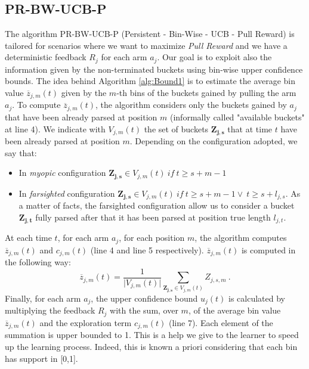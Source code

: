 \subsection{PR-BW-UCB-P}
The algorithm PR-BW-UCB-P (Persistent - Bin-Wise - UCB - Pull Reward)  is tailored for scenarios where we want to maximize \emph{Pull Reward} and we have a deterministic feedback $R_j$ for each arm $a_j$. Our goal is to exploit also the information given by the non-terminated buckets using bin-wise upper confidence bounds. The idea behind Algorithm \ref{alg:Bound1} is to estimate the average bin value $\overline{z}_{j,m}(t)$ given by the $m$-th bins of the buckets gained by pulling the arm $a_j$. To compute $\overline{z}_{j,m}(t)$, the algorithm considers only the buckets gained by $a_j$ that have been already parsed at position $m$ (informally called "available buckets" at line 4). We indicate with $V_{j,m}(t)$ the set of buckets $\boldsymbol{Z_{j,s}}$ that at time $t$ have been already parsed at position $m$. Depending on the configuration adopted, we say that:
\begin{itemize}
	\item In \emph{myopic} configuration  $\boldsymbol{Z_{j,s}} \in V_{j,m}(t) \ if \ t\geq s+m-1$
	\item In \emph{farsighted} configuration  $\boldsymbol{Z_{j,s}} \in V_{j,m}(t) \ if \ t\geq s+m-1 \vee \ t \geq s+l_{j,s} $. As a matter of facts, the farsighted configuration allow us to consider a bucket $\boldsymbol{Z_{j,t}}$ fully parsed after that it has been parsed at position true length $l_{j,t}$. 
\end{itemize}


At each time $t$, for each arm $a_j$, for each position $m$, the algorithm computes $\overline{z}_{j,m}(t)$ and $c_{j,m}(t)$ (line 4 and line 5 respectively). $\overline{z}_{j,m}(t)$ is computed in the following way: $$\overline{z}_{j,m}(t) = \frac{1}{\vert V_{j,m}(t) \vert} \sum_{\boldsymbol{Z_{j,s}} \in V_{j,m}(t)} Z_{j,s,m}\ .$$
Finally, for each arm $a_j$, the upper confidence bound $u_j(t)$ is calculated by multiplying the feedback $R_j$  with the sum, over $m$, of the average bin value $\overline{z}_{j,m}(t)$ and the exploration term  $c_{j,m}(t)$  (line 7). Each element of the summation is upper bounded to 1. This is a help we give to the learner to speed up the learning process. Indeed, this is known a priori considering that each bin has support in [0,1]. 









